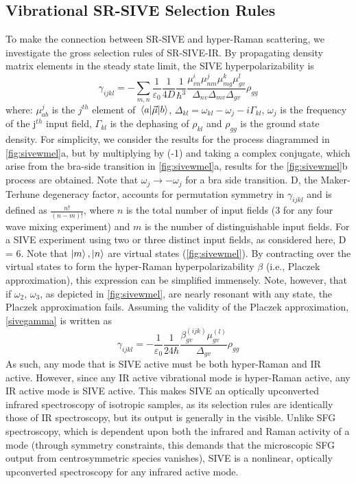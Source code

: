 \documentclass[aip, jcp, reprint, twocolumn]{revtex4-2}
\begin{document}
\subsection{Vibrational SR-SIVE Selection Rules}
To make the connection between SR-SIVE and hyper-Raman scattering, we investigate the gross selection rules of SR-SIVE-IR.
By propagating density matrix elements in the steady state limit, the SIVE hyperpolarizability is \cite{RN119}
\begin{equation}\label{sivegamma}
		\gamma_{ijkl} =	- \sum_{m, n} \frac{1}{\varepsilon_0} \frac{1}{4D} \frac{1}{\hbar^3} \frac{\mu^{i}_{v n} \mu^{j}_{nm} \mu^{k}_{mg} \mu^{l}_{gv} }{\Delta_{nv} \Delta_{mv}\Delta_{gv}}  \rho_{gg}
\end{equation}
where: $\mu^{j}_{ab}$ is the $j^{th}$ element of $\mel{a}{\vec{\mu}}{b}$, $\Delta_{kl} = \omega_{kl} - \omega_{j} - i\Gamma_{kl}$, $\omega_j$ is the frequency of the j$^{th}$ input field, $\Gamma_{kl}$ is the dephasing of $\rho_{kl}$ and $\rho_{gg}$ is the ground state density.
For simplicity, we consider the results for the process diagrammed in \autoref{fig:sivewmel}a, but by multiplying by (-1) and taking a complex conjugate, which arise from the bra-side transition in \autoref{fig:sivewmel}a, results for the \autoref{fig:sivewmel}b  process are obtained.
Note that $\omega_j \rightarrow -\omega_j$ for a bra side transition.
D, the Maker-Terhune degeneracy factor, accounts for permutation symmetry in $\gamma_{ijkl}$ and is defined as $\frac{n!}{(n-m)!}$, where $n$ is the total number of input fields (3 for any four wave mixing experiment) and $m$ is the number of distinguishable input fields.\cite{RN134} 
For a SIVE experiment using two or three distinct input fields, as considered here, D = 6.
Note that $\ket{m}, \ket{n}$ are virtual states (\autoref{fig:sivewmel}).
By contracting over the virtual states to form the hyper-Raman hyperpolarizability $\beta$ (i.e., Placzek approximation), this expression can be simplified immensely.\cite{Long1970} 
Note, however, that if $\omega_2$, $\omega_3$, as depicted in \autoref{fig:sivewmel}, are nearly resonant with any state, the Placzek approximation fails. \cite{Placzek1934, Long1970}
Assuming the validity of the Placzek approximation, \autoref{sivegamma} is written as 
\begin{equation}\label{sivebeta}
	\gamma_{ijkl} =	-\frac{1}{\varepsilon_0} \frac{1}{24 \hbar}\frac{\beta^{(ijk)}_{gv} \mu^{(l)}_{gv}}{\Delta_{gv}} \rho_{gg}
\end{equation}
As such, any mode that is SIVE active must be both hyper-Raman and IR active.
However, since any IR active vibrational mode is hyper-Raman active,\cite{Cyvin1965, Andrews1978} any IR active mode is SIVE active.
This makes SIVE an optically upconverted infrared spectroscopy of isotropic samples, as its selection rules are identically those of IR spectroscopy, but its output is generally in the visible.
Unlike SFG spectroscopy, which is dependent upon both the infrared and Raman activity of a mode (through symmetry constraints, this demands that the microscopic SFG output from centrosymmetric species vanishes),\cite{Shen90, Cotton} SIVE is a nonlinear, optically upconverted spectroscopy for any infrared active mode.
\end{document}
